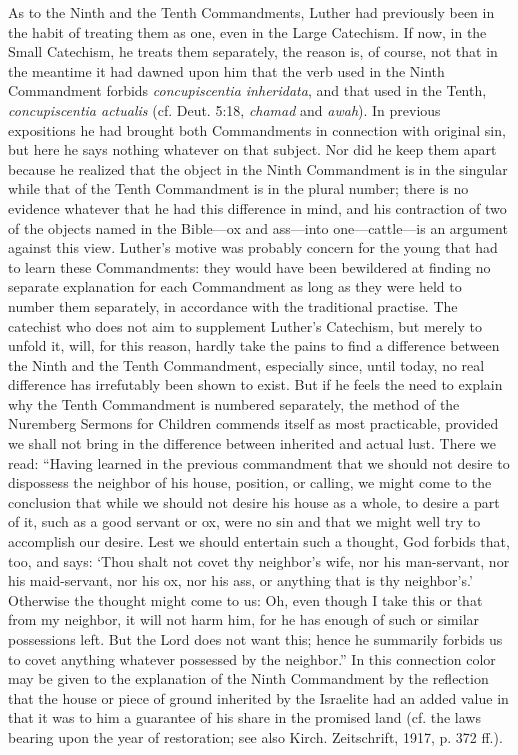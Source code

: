 As to the Ninth and the Tenth Commandments, Luther had previously been in the habit of treating them as one, even in the Large Catechism. If now, in the Small Catechism, he treats them separately, the reason is, of course, not that in the meantime it had dawned upon him that the verb used in the Ninth Commandment forbids \emph{concupiscentia inheridata}, and that used in the Tenth, \emph{concupiscentia actualis} (cf. Deut. 5:18, \emph{chamad} and \emph{awah}). In previous expositions he had brought both Commandments in connection with original sin, but here he says nothing whatever on that subject. Nor did he keep them apart because he realized that the object in the Ninth Commandment is in the singular while that of the Tenth Commandment is in the plural number; there is no evidence whatever that he had this difference in mind, and his contraction of two of the objects named in the Bible—ox and ass—into one—cattle—is an argument against this view. Luther’s motive was probably concern for the young that had to learn these Commandments: they would have been bewildered at finding no separate explanation for each Commandment as long as they were held to number them separately, in accordance with the traditional practise. The catechist who does not aim to supplement Luther’s Catechism, but merely to unfold it, will, for this reason, hardly take the pains to find a difference between the Ninth and the Tenth Commandment, especially since, until today, no real difference has irrefutably been shown to exist. But if he feels the need to explain why the Tenth Commandment is numbered separately, the method of the Nuremberg Sermons for Children commends itself as most practicable, provided we shall not bring in the difference between inherited
and actual lust. There we read: “Having learned in the previous commandment that we should not desire to dispossess the neighbor of his house, position, or calling, we might come to the conclusion that while we should not desire his house as a whole, to desire a part of it, such as a good servant or ox, were no sin and that we might well try to accomplish our desire. Lest we should entertain such a thought, God forbids that, too, and says: ‘Thou shalt not covet thy neighbor’s wife, nor his man-servant, nor his maid-servant, nor his ox, nor his ass, or anything that is thy neighbor’s.’ Otherwise the thought might come to us: Oh, even though I take this or that from my neighbor, it will not harm him, for he has enough of such or similar possessions left. But the Lord does not want this; hence he summarily forbids us to covet anything whatever possessed by the neighbor.” In this connection color may be given to the explanation of the Ninth Commandment by the reflection that the house or piece of ground inherited by the Israelite had an added value in that it was to him a guarantee of his share in the promised land (cf. the laws bearing upon the year of restoration; see also Kirch. Zeitschrift, 1917, p. 372 ff.).

